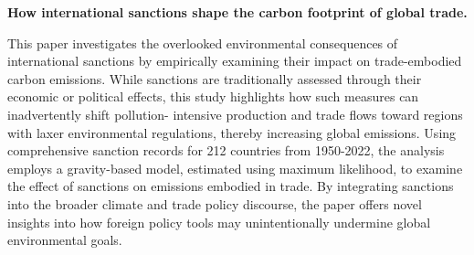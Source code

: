 \vspace{1em}
\textbf{How international sanctions shape the carbon footprint of global trade.}
\vspace{1em}

 \parbox{\textwidth}{This paper investigates the overlooked environmental consequences of international sanctions by empirically examining their impact on trade-embodied carbon emissions. While sanctions are traditionally assessed through their economic or political effects, this study highlights how such measures can inadvertently shift pollution- intensive production and trade flows toward regions with laxer environmental regulations, thereby increasing global emissions. Using comprehensive sanction records for 212 countries from 1950-2022, the analysis employs a gravity-based model, estimated using maximum likelihood, to examine the effect of sanctions on emissions embodied in trade. By integrating sanctions into the broader climate and trade policy discourse, the paper offers novel insights into how foreign policy tools may unintentionally undermine global environmental goals.}




